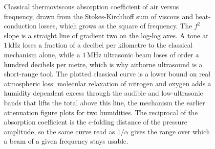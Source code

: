 \begin{figure}[htbp]
\centering
{}
\caption[Classical thermoviscous absorption of air]{Classical
thermoviscous absorption coefficient of air versus frequency, drawn from
the Stokes-Kirchhoff sum of viscous and heat-conduction losses, which
grows as the square of frequency. The $f^2$ slope is a straight line of
gradient two on the log-log axes. A tone at $1\,\si{\kilo\hertz}$ loses a
fraction of a decibel per kilometre to the classical mechanism alone,
while a $1\,\si{\mega\hertz}$ ultrasonic beam loses of order a hundred
decibels per metre, which is why airborne ultrasound is a short-range
tool. The plotted classical curve is a lower bound on real atmospheric
loss: molecular relaxation of nitrogen and oxygen adds a humidity
dependent excess through the audible and low-ultrasonic bands that lifts
the total above this line, the mechanism the earlier attenuation figure
plots for two humidities. The reciprocal of the absorption coefficient is
the $e$-folding distance of the pressure amplitude, so the same curve read
as $1/\alpha$ gives the range over which a beam of a given frequency stays
usable.}
\label{fig:vol03ch07:classical-absorption}
\end{figure}
